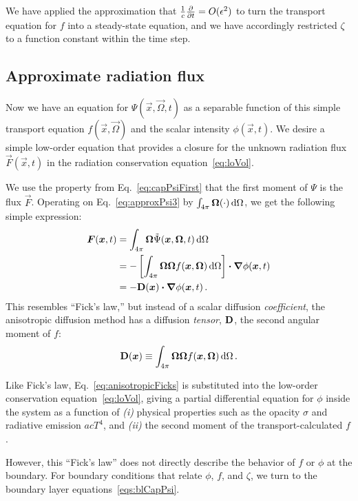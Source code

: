 We have applied the approximation that $\frac{1}{c}\frac{\partial }{\partial t}= O(\epsilon^2)$
to turn the transport equation for $f$ into a steady-state equation, and we have
accordingly restricted $\zeta$ to a function constant within the time step.

\subsection{Approximate radiation flux}
Now we have an equation for $\Psi(\vec{x}, \vec{\Omega}, t)$ as a
separable
function of this simple transport equation $f(\vec{x}, \vec{\Omega})$ and the
scalar intensity $\phi(\vec{x},t)$.
We desire a simple low-order equation that provides a closure for the unknown
radiation flux $\vec{F}(\vec{x},t)$ in the radiation conservation
equation~\eqref{eq:loVol}.

We use the property from Eq.~\eqref{eq:capPsiFirst}
that the first moment of $\Psi$ is the flux $\vec{F}$. Operating on 
Eq.~\eqref{eq:approxPsi3} by $\int_{4\pi} \bm{\Omega} (\cdot) \mathop{}\!\mathrm{d}\Omega$, we
get
the following simple expression:
\begin{align} \nonumber
  \bm{F}(\bm{x}, t)
  &= \int_{4\pi} \bm{\Omega} \tilde \Psi(\bm{x}, \bm{\Omega}, t) \mathop{}\!\mathrm{d}\Omega
  \\ \nonumber
  &= 
  - \left[ \int_{4\pi} \bm{\Omega} \bm{\Omega} f(\bm{x}, \bm{\Omega})
  \mathop{}\!\mathrm{d}\Omega \right]
  \bm{\cdot} \bm{\nabla} \phi(\bm{x},t)
  \\ \label{eq:anisotropicFicks}
  &= - \mathbf{D}(\bm{x}) \bm{\cdot} \bm{\nabla} \phi(\bm{x},t) \,.
\end{align}
This resembles ``Fick's law,'' but instead of a scalar diffusion
\emph{coefficient},
the anisotropic diffusion method has a diffusion \emph{tensor}, $\mathbf{D}$, the
second angular moment of $f$:
\begin{equation}\label{eq:dDefinition}
  \mathbf{D}(\bm{x}) \equiv \int_{4\pi} \bm{\Omega} \bm{\Omega}
  f(\bm{x}, \bm{\Omega}) \mathop{}\!\mathrm{d}\Omega \,.
\end{equation}

Like Fick's law, Eq.~\eqref{eq:anisotropicFicks} is substituted into
the low-order conservation equation~\eqref{eq:loVol}, giving a partial
differential equation for $\phi$ inside the system as a function of \textsl{(i)}
physical properties such as the opacity $\sigma$ and radiative emission $a c
T^4$, and \textsl{(ii)} the second moment of the transport-calculated $f$.

However, this ``Fick's law'' does not directly describe the behavior of $f$ or
$\phi$ at the boundary. For boundary conditions that relate $\phi$, $f$, and
$\zeta$, we turn to the boundary layer equations~\eqref{eqs:blCapPsi}.

